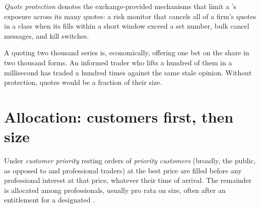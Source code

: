 \begin{definition}\label{def:m1:options-market-structure:protection}
\emph{Quote protection} denotes the exchange-provided
mechanisms that limit a 's exposure across its many quotes: a
risk monitor that cancels all of a firm's quotes in a class when its fills
within a short window exceed a set number, bulk cancel messages, and
kill switches.
\end{definition}

A  quoting two thousand series is, economically, offering one
bet on the share in two thousand forms. An informed trader who lifts a
hundred of them in a millisecond has traded a hundred times against the same
stale opinion. Without protection, quotes would be a fraction of their size.

\section{Allocation: customers first, then size}

\begin{definition}\label{def:m1:options-market-structure:customer}
Under \emph{customer priority} resting orders of
\emph{priority customers} (broadly, the public, as opposed to 
and professional traders) at the best price are filled before any
professional interest at that price, whatever their time of arrival. The
remainder is allocated among professionals, usually pro rata on size, often
after an entitlement for a designated .
\end{definition}

